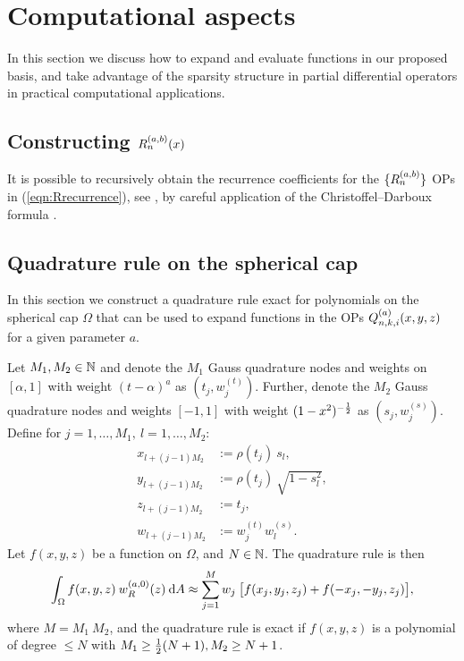 \documentclass[11pt, oneside]{article}   	%
\begin{document}
%
\section{Computational aspects}\label{Section:Computation}

In this section we discuss how to expand and evaluate functions in our proposed basis, and take advantage of the sparsity structure in partial differential operators in practical computational applications.


\subsection{Constructing $R_n^{(a,b)}(x)$}

It is possible to recursively obtain the recurrence coefficients for the $\{R_n^{(a,b)}\}$ OPs in (\ref{eqn:Rrecurrence}), see \cite{snowball2019sparse}, by careful application of the Christoffel--Darboux formula \cite[18.2.12]{DLMF}.


\subsection{Quadrature rule on the spherical cap}\label{subsection:quadrule}

In this section we construct a quadrature rule exact for polynomials on the spherical cap $\Omega$ that can be used to expand functions in the OPs $Q_{n,k,i}^{(a)}(x,y,z)$ for a given parameter $a$.

\begin{theorem}\label{Theorem:quadrule}
	Let $M_1, M_2 \in \mathbb{N}$ and denote the $M_1$ Gauss quadrature nodes and weights on $[\alpha,1]$ with weight $(t - \alpha)^a$ as $(t_j, w_j^{(t)})$. Further, denote the $M_2$ Gauss quadrature nodes and weights $[-1,1]$ with weight $(1 - x^2)^{-\frac{1}{2}}$ as $(s_j, w_j^{(s)})$.
Define for $j = 1,\dots,M_1, \: l=1,\dots,M_2$:
\begin{align*}
	x_{l+(j-1)M_2} &:= \rho(t_j) \: s_l, \\
	y_{l+(j-1)M_2} &:= \rho(t_j) \: \sqrt{1-s_l^2}, \\
	z_{l+(j-1)M_2} &:= t_j, \\
	w_{l+(j-1)M_2} &:= w_j^{(t)} w_l^{(s)}.
\end{align*}
Let $f(x,y,z)$ be a function on $\Omega$, and $N \in \mathbb{N}$. The quadrature rule is then
\begin{align*}
	\int_\Omega f(x,y,z) \: w_R^{(a,0)}(z) \: {\rm d} A \approx \sum_{j=1}^{M} w_j \: \big[ f(x_j, y_j, z_j) + f(-x_j, -y_j, z_j) \big],
\end{align*}
where $M = M_1 \: M_2$, and the quadrature rule is exact if $f(x,y,z)$ is a polynomial of degree $\le N$ with $M_1 \ge \frac{1}{2} (N+1), M_2 \ge N+1$.
\end{theorem}
\end{document}
